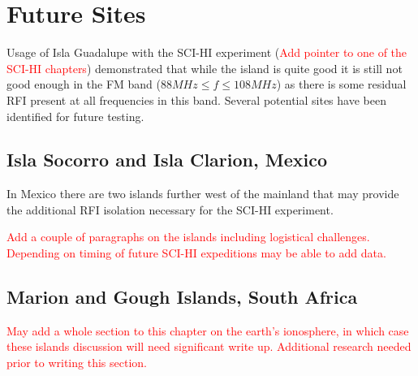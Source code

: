 \section{Future Sites}

Usage of Isla Guadalupe with the SCI-HI experiment (\textcolor{red}{Add pointer to one of the SCI-HI chapters}) demonstrated that while the island is quite good it is still not good enough in the FM band ($88 MHz \leq f \leq 108 MHz$) as there is some residual RFI present at all frequencies in this band. Several potential sites have been identified for future testing. 

\subsection{Isla Socorro and Isla Clarion, Mexico}
In Mexico there are two islands further west of the mainland that may provide the additional RFI isolation necessary for the SCI-HI experiment. 

\textcolor{red}{Add a couple of paragraphs on the islands including logistical challenges. Depending on timing of future SCI-HI expeditions may be able to add data.}

\subsection{Marion and Gough Islands, South Africa}

\textcolor{red}{May add a whole section to this chapter on the earth's ionosphere, in which case these islands discussion will need significant write up. Additional research needed prior to writing this section. }



